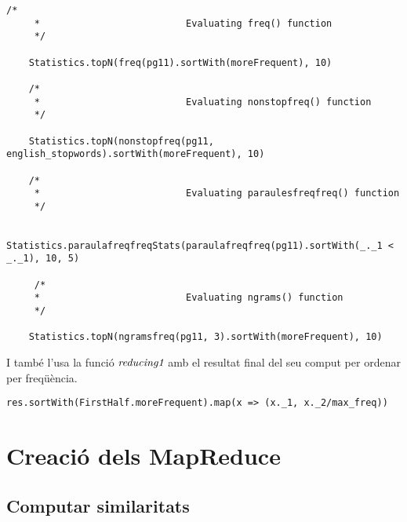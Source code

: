 \documentclass{report}
\begin{document}
\begin{lstlisting}[style=scalaHighlight]
/*
     * 							Evaluating freq() function
     */

    Statistics.topN(freq(pg11).sortWith(moreFrequent), 10)

    /*
     * 							Evaluating nonstopfreq() function
     */

    Statistics.topN(nonstopfreq(pg11, english_stopwords).sortWith(moreFrequent), 10)

    /*
     * 							Evaluating paraulesfreqfreq() function
     */

    Statistics.paraulafreqfreqStats(paraulafreqfreq(pg11).sortWith(_._1 < _._1), 10, 5)

     /*
     * 							Evaluating ngrams() function
     */

    Statistics.topN(ngramsfreq(pg11, 3).sortWith(moreFrequent), 10)
\end{lstlisting}

I també l'usa la funció $ \emph{reducing1} $ amb el resultat final del seu comput per ordenar per freqüència.

\begin{lstlisting}[style=scalaHighlight]
    res.sortWith(FirstHalf.moreFrequent).map(x => (x._1, x._2/max_freq))
\end{lstlisting}

\chapter{Creació dels MapReduce}

\section{Computar similaritats}
\end{document}

